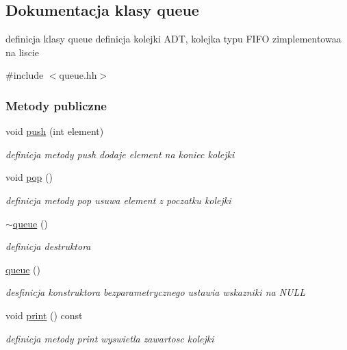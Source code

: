 \hypertarget{classqueue}{}\subsection{Dokumentacja klasy queue}
\label{classqueue}


definicja klasy queue definicja kolejki A\+D\+T, kolejka typu F\+I\+F\+O zimplementowaa na liscie  




{\ttfamily \#include $<$queue.\+hh$>$}

\subsubsection*{Metody publiczne}
\begin{DoxyCompactItemize}
\item 
void \hyperlink{classqueue_a94621434051ab5f39a20e1ab8dd1fcc5}{push} (int element)
\begin{DoxyCompactList}\small\item\em definicja metody push dodaje element na koniec kolejki \end{DoxyCompactList}\item 
void \hyperlink{classqueue_a64eb1ff3abb18bc130ab7390c9743f80}{pop} ()
\begin{DoxyCompactList}\small\item\em definicja metody pop usuwa element z poczatku kolejki \end{DoxyCompactList}\item 
\hyperlink{classqueue_ae627ff3c7e0015717518229b43b023a1}{$\sim$queue} ()
\begin{DoxyCompactList}\small\item\em definicja destruktora \end{DoxyCompactList}\item 
\hyperlink{classqueue_a7d34ca890402e85d02107280b32ae73a}{queue} ()
\begin{DoxyCompactList}\small\item\em desfinicja konstruktora bezparametrycznego ustawia wskazniki na N\+U\+L\+L \end{DoxyCompactList}\item 
void \hyperlink{classqueue_aa0ab9e292d17a60504bfa72e6d48aee2}{print} () const 
\begin{DoxyCompactList}\small\item\em definicja metody print wyswietla zawartosc kolejki \end{DoxyCompactList}\end{DoxyCompactItemize}
